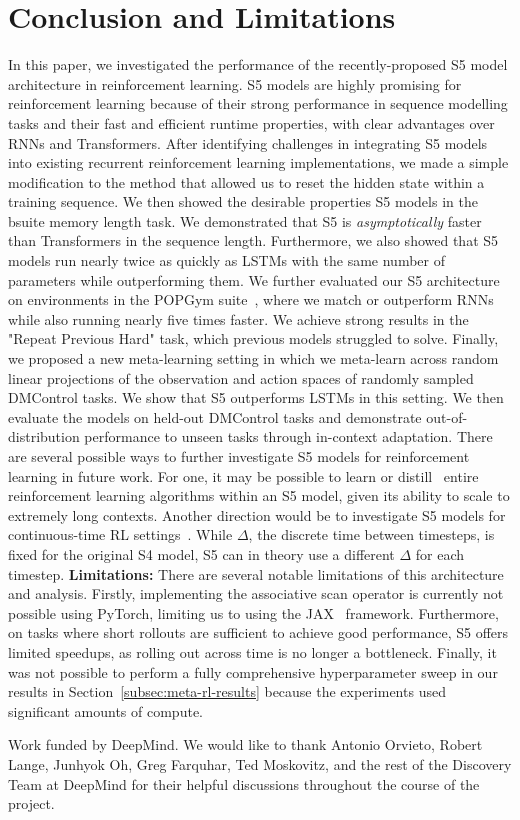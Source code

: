 \documentclass{article}
\begin{document}
\section{Conclusion and Limitations}
In this paper, we investigated the performance of the recently-proposed S5 model architecture in reinforcement learning. S5 models are highly promising for reinforcement learning because of their strong performance in sequence modelling tasks and their fast and efficient runtime properties, with clear advantages over RNNs and Transformers. After identifying challenges in integrating S5 models into existing recurrent reinforcement learning implementations, we made a simple modification to the method that allowed us to reset the hidden state within a training sequence.
We then showed the desirable properties S5 models in the bsuite memory length task. We demonstrated that S5 is \textit{asymptotically} faster than Transformers in the sequence length. Furthermore, we also showed that S5 models run nearly twice as quickly as LSTMs with the same number of parameters while outperforming them. We further evaluated our S5 architecture on environments in the POPGym suite~\citep{morad2023popgym}, where we match or outperform RNNs while also running nearly five times faster. We achieve strong results in the "Repeat Previous Hard" task, which previous models struggled to solve.
Finally, we proposed a new meta-learning setting in which we meta-learn across random linear projections of the observation and action spaces of randomly sampled DMControl tasks. We show that S5 outperforms LSTMs in this setting. We then evaluate the models on held-out DMControl tasks and demonstrate out-of-distribution performance to unseen tasks through in-context adaptation.
There are several possible ways to further investigate S5 models for reinforcement learning in future work. For one, it may be possible to learn or distill~\citep{laskin2022context} entire reinforcement learning algorithms within an S5 model, given its ability to scale to extremely long contexts.
Another direction would be to investigate S5 models for continuous-time RL settings~\citep{doya2000reinforcement}. While $\Delta$, the discrete time between timesteps, is fixed for the original S4 model, S5 can in theory use a different $\Delta$ for each timestep.
\textbf{Limitations:} There are several notable limitations of this architecture and analysis. Firstly, implementing the associative scan operator is currently not possible using PyTorch, limiting us to using the JAX~\cite{jax2018github} framework. Furthermore, on tasks where short rollouts are sufficient to achieve good performance, S5 offers limited speedups, as rolling out across time is no longer a bottleneck. Finally, it was not possible to perform a fully comprehensive hyperparameter sweep in our results in Section~\ref{subsec:meta-rl-results} because the experiments used significant amounts of compute.
\begin{ack}
Work funded by DeepMind. We would like to thank Antonio Orvieto, Robert Lange, Junhyok Oh, Greg Farquhar, Ted Moskovitz, and the rest of the Discovery Team at DeepMind for their helpful discussions throughout the course of the project.
\end{ack}


\newpage
\appendix
\end{document}
